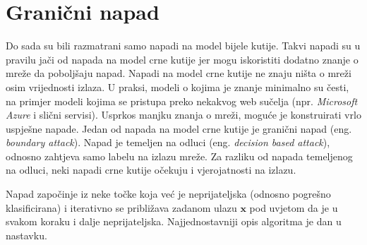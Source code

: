 \documentclass[utf8, diplomski]{fer}
\begin{document}
\section{Granični napad} Do sada su bili razmatrani samo napadi na model bijele kutije. Takvi napadi su u pravilu jači od napada na model crne kutije jer mogu iskoristiti dodatno znanje o mreže da poboljšaju napad. Napadi na model crne kutije ne znaju ništa o mreži osim vrijednosti izlaza. U praksi, modeli o kojima je znanje minimalno su česti, na primjer modeli kojima se pristupa preko nekakvog web sučelja (npr. \textit{Microsoft Azure} i slični servisi). Usprkos manjku znanja o mreži, moguće je konstruirati vrlo uspješne napade.
Jedan od napada na model crne kutije je granični napad (eng. \textit{boundary attack}). Napad je temeljen na odluci (eng. \textit{decision based attack}), odnosno zahtjeva samo labelu na izlazu mreže. Za razliku od napada temeljenog na odluci, neki napadi crne kutije očekuju i vjerojatnosti na izlazu. \par
Napad započinje iz neke točke koja već je neprijateljska (odnosno pogrešno klasificirana) i iterativno se približava zadanom ulazu $\boldsymbol{x}$ pod uvjetom da je u svakom koraku i dalje neprijateljska. Najjednostavniji opis algoritma je dan u nastavku.
\end{document}
